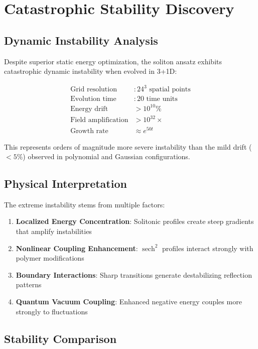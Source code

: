 \documentclass[12pt,a4paper]{article}
\begin{document}
\section{Catastrophic Stability Discovery}

\subsection{Dynamic Instability Analysis}

Despite superior static energy optimization, the soliton ansatz exhibits catastrophic dynamic instability when evolved in 3+1D:

\begin{align}
\text{Grid resolution} &: 24^3 \text{ spatial points} \\
\text{Evolution time} &: 20 \text{ time units} \\
\text{Energy drift} &> 10^{10}\% \\
\text{Field amplification} &> 10^{32} \times \\
\text{Growth rate} &\approx e^{50t}
\end{align}

This represents orders of magnitude more severe instability than the mild drift ($< 5\%$) observed in polynomial and Gaussian configurations.

\subsection{Physical Interpretation}

The extreme instability stems from multiple factors:

\begin{enumerate}
\item \textbf{Localized Energy Concentration}: Solitonic profiles create steep gradients that amplify instabilities
\item \textbf{Nonlinear Coupling Enhancement}: $\operatorname{sech}^2$ profiles interact strongly with polymer modifications
\item \textbf{Boundary Interactions}: Sharp transitions generate destabilizing reflection patterns
\item \textbf{Quantum Vacuum Coupling}: Enhanced negative energy couples more strongly to fluctuations
\end{enumerate}

\subsection{Stability Comparison}
\end{document}
